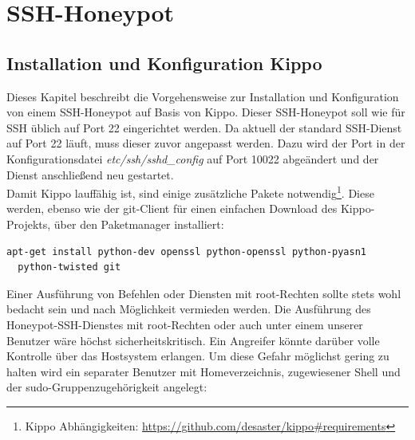 \section{SSH-Honeypot}
\label{sec:SSH-Honeypot}

\subsection{Installation und Konfiguration Kippo}
\label{subsec:Installation und Konfiguration Kippo}



Dieses Kapitel beschreibt die Vorgehensweise zur Installation und Konfiguration von einem SSH-Honeypot auf Basis von Kippo. Dieser SSH-Honeypot soll wie für SSH üblich auf Port 22 eingerichtet werden. Da aktuell der standard SSH-Dienst auf Port 22 läuft, muss dieser zuvor angepasst werden. Dazu wird der Port in der Konfigurationsdatei \textit{etc/ssh/sshd\_config} auf Port 10022 abgeändert und der Dienst anschließend neu gestartet.\\

Damit Kippo lauffähig ist, sind einige zusätzliche Pakete notwendig\footnote{ Kippo Abhängigkeiten: \url{https://github.com/desaster/kippo\#requirements}}. Diese werden, ebenso wie der git-Client für einen einfachen Download des Kippo-Projekts, über den Paketmanager installiert:

\begin{lstlisting}[style=customc]
apt-get install python-dev openssl python-openssl python-pyasn1 
  python-twisted git
\end{lstlisting}

Einer Ausführung von Befehlen oder Diensten mit root-Rechten sollte stets wohl bedacht sein und nach Möglichkeit vermieden werden. Die Ausführung des Honeypot-SSH-Dienstes mit root-Rechten oder auch unter einem unserer Benutzer wäre höchst sicherheitskritisch. Ein Angreifer könnte darüber volle Kontrolle über das Hostsystem erlangen. Um diese Gefahr möglichst gering zu halten wird ein separater Benutzer mit Homeverzeichnis, zugewiesener Shell und der sudo-Gruppenzugehörigkeit angelegt:

